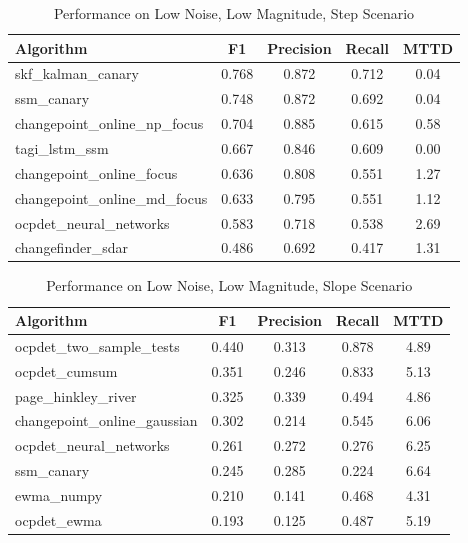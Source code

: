 \documentclass[journal,article,submit,pdftex,moreauthors]{Definitions/mdpi}
\begin{document}
\clearpage

\begin{table}[ht]
\centering
\caption{Performance on Low Noise, Low Magnitude, Step Scenario}
\label{tab:scenario_bajo_bajo_escalon}
\small
\begin{tabular}{lcccc}
\toprule
\textbf{Algorithm} & \textbf{F1} & \textbf{Precision} & \textbf{Recall} & \textbf{MTTD} \\
\midrule
skf\_kalman\_canary & 0.768 & 0.872 & 0.712 & 0.04 \\
ssm\_canary & 0.748 & 0.872 & 0.692 & 0.04 \\
changepoint\_online\_np\_focus & 0.704 & 0.885 & 0.615 & 0.58 \\
tagi\_lstm\_ssm & 0.667 & 0.846 & 0.609 & 0.00 \\
changepoint\_online\_focus & 0.636 & 0.808 & 0.551 & 1.27 \\
changepoint\_online\_md\_focus & 0.633 & 0.795 & 0.551 & 1.12 \\
ocpdet\_neural\_networks & 0.583 & 0.718 & 0.538 & 2.69 \\
changefinder\_sdar & 0.486 & 0.692 & 0.417 & 1.31 \\
\bottomrule
\end{tabular}
\end{table}

\clearpage

\begin{table}[ht]
\centering
\caption{Performance on Low Noise, Low Magnitude, Slope Scenario}
\label{tab:scenario_bajo_bajo_pendiente}
\small
\begin{tabular}{lcccc}
\toprule
\textbf{Algorithm} & \textbf{F1} & \textbf{Precision} & \textbf{Recall} & \textbf{MTTD} \\
\midrule
ocpdet\_two\_sample\_tests & 0.440 & 0.313 & 0.878 & 4.89 \\
ocpdet\_cumsum & 0.351 & 0.246 & 0.833 & 5.13 \\
page\_hinkley\_river & 0.325 & 0.339 & 0.494 & 4.86 \\
changepoint\_online\_gaussian & 0.302 & 0.214 & 0.545 & 6.06 \\
ocpdet\_neural\_networks & 0.261 & 0.272 & 0.276 & 6.25 \\
ssm\_canary & 0.245 & 0.285 & 0.224 & 6.64 \\
ewma\_numpy & 0.210 & 0.141 & 0.468 & 4.31 \\
ocpdet\_ewma & 0.193 & 0.125 & 0.487 & 5.19 \\
\bottomrule
\end{tabular}
\end{table}
\end{document}
